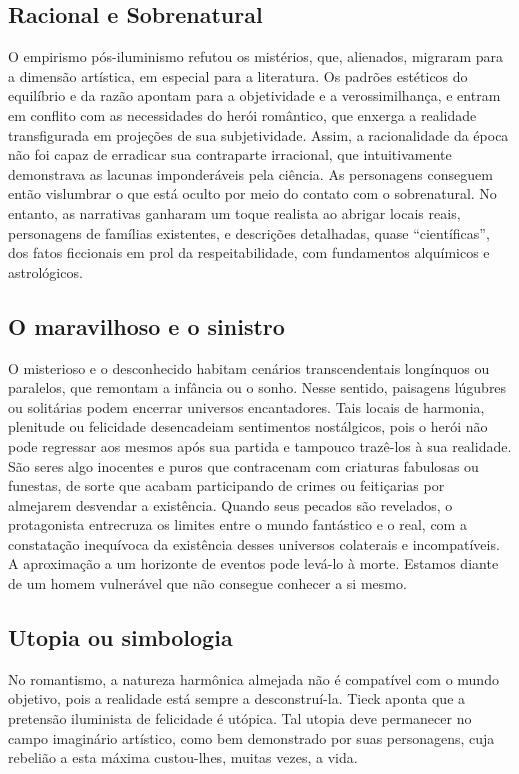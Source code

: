 \documentclass[12pt]{extarticle}
\begin{document}
\subsection{Racional e Sobrenatural}

O empirismo pós-iluminismo refutou os mistérios, que, alienados,
migraram para a dimensão artística, em especial para a literatura. Os
padrões estéticos do equilíbrio e da razão apontam para a objetividade e
a verossimilhança, e entram em conflito com as necessidades do herói
romântico, que enxerga a realidade transfigurada em projeções de sua
subjetividade. Assim, a racionalidade da época não foi capaz de
erradicar sua contraparte irracional, que intuitivamente demonstrava as
lacunas imponderáveis pela ciência. As personagens conseguem então
vislumbrar o que está oculto por meio do contato com o sobrenatural. No
entanto, as narrativas ganharam um toque realista ao abrigar locais
reais, personagens de famílias existentes, e descrições detalhadas,
quase ``científicas'', dos fatos ficcionais em prol da respeitabilidade,
com fundamentos alquímicos e astrológicos.

\subsection{O maravilhoso e o sinistro}

O misterioso e o desconhecido habitam cenários transcendentais
longínquos ou paralelos, que remontam a infância ou o sonho. Nesse
sentido, paisagens lúgubres ou solitárias podem encerrar universos
encantadores. Tais locais de harmonia, plenitude ou felicidade
desencadeiam sentimentos nostálgicos, pois o herói não pode regressar
aos mesmos após sua partida e tampouco trazê-los à sua realidade. São
seres algo inocentes e puros que contracenam com criaturas fabulosas ou
funestas, de sorte que acabam participando de crimes ou feitiçarias por
almejarem desvendar a existência. Quando seus pecados são revelados, o
protagonista entrecruza os limites entre o mundo fantástico e o real,
com a constatação inequívoca da existência desses universos colaterais e
incompatíveis. A aproximação a um horizonte de eventos pode levá-lo à
morte. Estamos diante de um homem vulnerável que não consegue conhecer a
si mesmo.

\subsection{Utopia ou simbologia}

No romantismo, a natureza harmônica almejada não é compatível com o
mundo objetivo, pois a realidade está sempre a desconstruí-la. Tieck
aponta que a pretensão iluminista de felicidade é utópica. Tal utopia
deve permanecer no campo imaginário artístico, como bem demonstrado por
suas personagens, cuja rebelião a esta máxima custou-lhes, muitas vezes,
a vida.
\end{document}
